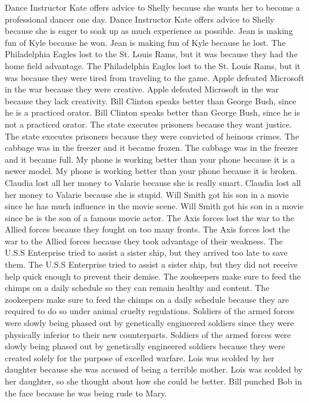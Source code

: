\documentclass{article}
\begin{document}
\begin{enumerate}
Dance Instructor Kate offers advice to Shelly because she wants her to become a professional dancer one day.
Dance Instructor Kate offers advice to Shelly because she is eager to soak up as much experience as possible.
Jean is making fun of Kyle because he won.
Jean is making fun of Kyle because he lost.
The Philadelphia Eagles lost to the St. Louis Rams, but it was because they had the home field advantage.
The Philadelphia Eagles lost to the St. Louis Rams, but it was because they were tired from traveling to the game.
Apple defeated Microsoft in the war because they were creative.
Apple defeated Microsoft in the war because they lack creativity.
Bill Clinton speaks better than George Bush, since he is a practiced orator.
Bill Clinton speaks better than George Bush, since he is not a practiced orator.
The state executes prisoners because they want justice.
The state executes prisoners because they were convicted of heinous crimes.
The cabbage was in the freezer and it became frozen.
The cabbage was in the freezer and it became full.
My phone is working better than your phone because it is a newer model.
My phone is working better than your phone because it is broken.
Claudia lost all her money to Valarie because she is really smart.
Claudia lost all her money to Valarie because she is stupid.
Will Smith got his son in a movie since he has much influence in the movie scene.
Will Smith got his son in a movie since he is the son of a famous movie actor.
The Axis forces lost the war to the Allied forces because they fought on too many fronts.
The Axis forces lost the war to the Allied forces because they took advantage of their weakness.
The U.S.S Enterprise tried to assist a sister ship, but they arrived too late to save them.
The U.S.S Enterprise tried to assist a sister ship, but they did not receive help quick enough to prevent their demise.
The zookeepers make sure to feed the chimps on a daily schedule so they can remain healthy and content.
The zookeepers make sure to feed the chimps on a daily schedule because they are required to do so under animal cruelty regulations.
Soldiers of the armed forces were slowly being phased out by genetically engineered soldiers since they were physically inferior to their new counterparts.
Soldiers of the armed forces were slowly being phased out by genetically engineered soldiers because they were created solely for the purpose of excelled warfare.
Lois was scolded by her daughter because she was accused of being a terrible mother.
Lois was scolded by her daughter, so she thought about how she could be better.
Bill punched Bob in the face because he was being rude to Mary.

\end{enumerate}
\end{document}
